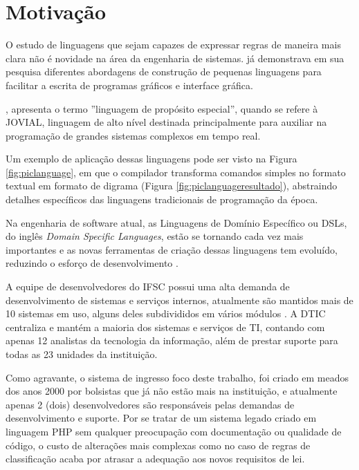 \section{Motivação}
\label{motivacao}

O estudo de linguagens que sejam capazes de expressar regras de maneira mais clara não é novidade na área da engenharia de sistemas.  já demonstrava em sua pesquisa diferentes abordagens de construção de pequenas linguagens para facilitar a escrita de programas gráficos e interface gráfica.


, apresenta o termo ''linguagem de propósito especial'', quando se refere à \gls{JOVIAL}, linguagem de alto nível destinada principalmente para auxiliar na programação de grandes sistemas complexos em tempo real. 

Um exemplo de aplicação dessas linguagens pode ser visto na Figura \ref{fig:piclanguage}, em que o compilador transforma comandos simples no formato textual em formato de digrama (Figura \ref{fig:piclanguageresultado}), abstraindo detalhes específicos das linguagens tradicionais de programação da época.




Na engenharia de software atual, as Linguagens de Domínio Específico ou DSLs, do inglês \textit{Domain Specific Languages}, estão se tornando cada vez mais importantes e as novas ferramentas de criação dessas linguagens tem evoluído, reduzindo o esforço de desenvolvimento \cite{dslengineering}.

A equipe de desenvolvedores do \gls{IFSC} possui uma alta demanda de desenvolvimento de sistemas e serviços internos, atualmente são mantidos mais de 10 sistemas em uso, alguns deles subdivididos em vários módulos \cite{catalogoifsc}. A \gls{DTIC} centraliza e mantém a maioria dos sistemas e serviços de TI, contando com apenas 12 analistas da tecnologia da informação, além de prestar suporte para todas as 23 unidades da instituição. 

Como agravante, o sistema de ingresso foco deste trabalho, foi criado em meados dos anos 2000 por bolsistas que já não estão mais na instituição, e atualmente apenas 2 (dois) desenvolvedores são responsáveis pelas demandas de desenvolvimento e suporte. Por se tratar de um sistema legado criado em linguagem PHP sem qualquer preocupação com documentação ou qualidade de código, o custo de alterações mais complexas como no caso de regras de classificação acaba por atrasar a adequação aos novos requisitos de lei. 

